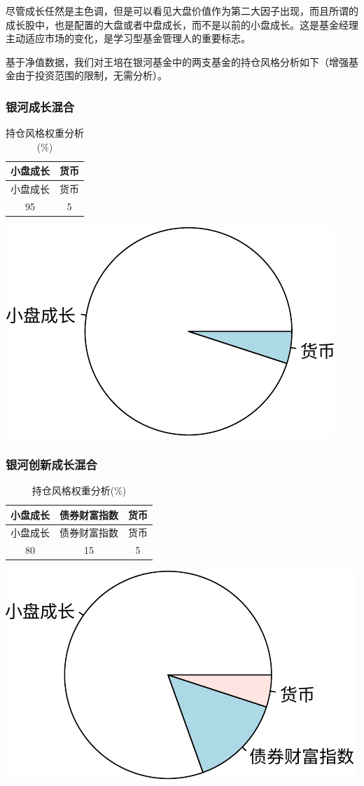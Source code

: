 \documentclass[hyperref,]{ctexart}
\begin{document}
尽管成长任然是主色调，但是可以看见大盘价值作为第二大因子出现，而且所谓的成长股中，也是配置的大盘或者中盘成长，而不是以前的小盘成长。这是基金经理主动适应市场的变化，是学习型基金管理人的重要标志。

基于净值数据，我们对王培在银河基金中的两支基金的持仓风格分析如下（增强基金由于投资范围的限制，无需分析）。

\subsubsection{银河成长混合}

\begin{longtable}[]{@{}cc@{}}
\caption{持仓风格权重分析(\%)}\tabularnewline
\toprule
小盘成长 & 货币\tabularnewline
\midrule
\endfirsthead
\toprule
小盘成长 & 货币\tabularnewline
\midrule
\endhead
95 & 5\tabularnewline
\bottomrule
\end{longtable}

\includegraphics{wangpei-details_files/figure-latex/unnamed-chunk-14-1.pdf}

\subsubsection{银河创新成长混合}

\begin{longtable}[]{@{}ccc@{}}
\caption{持仓风格权重分析(\%)}\tabularnewline
\toprule
小盘成长 & 债券财富指数 & 货币\tabularnewline
\midrule
\endfirsthead
\toprule
小盘成长 & 债券财富指数 & 货币\tabularnewline
\midrule
\endhead
80 & 15 & 5\tabularnewline
\bottomrule
\end{longtable}

\includegraphics{wangpei-details_files/figure-latex/unnamed-chunk-15-1.pdf}
\end{document}
